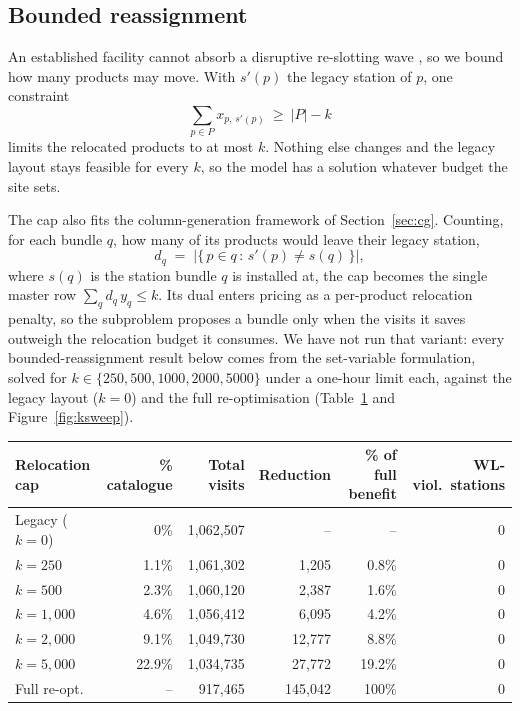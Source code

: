 \documentclass[]{interact}
\begin{document}
\subsection{Bounded reassignment}\label{sec:reassign}
An established facility cannot absorb a disruptive re-slotting wave \citep{chabot2024reassignment}, so we bound how many products may move. With $s'(p)$ the legacy station of $p$, one constraint
\begin{equation}
\sum_{p \in P} x_{p,\,s'(p)} \ \ge\ |P| - k
\label{eq:reassign}
\end{equation}
limits the relocated products to at most $k$. Nothing else changes and the legacy layout stays feasible for every $k$, so the model has a solution whatever budget the site sets.

The cap also fits the column-generation framework of Section~\ref{sec:cg}. Counting, for each bundle $q$, how many of its products would leave their legacy station,
\[
d_q \;=\; \bigl|\{\, p \in q \,:\, s'(p) \neq s(q) \,\}\bigr|,
\]
where $s(q)$ is the station bundle $q$ is installed at, the cap becomes the single master row $\sum_{q} d_q\, y_q \le k$. Its dual enters pricing as a per-product relocation penalty, so the subproblem proposes a bundle only when the visits it saves outweigh the relocation budget it consumes. We have not run that variant: every bounded-reassignment result below comes from the set-variable formulation, solved for $k \in \{250, 500, 1000, 2000, 5000\}$ under a one-hour limit each, against the legacy layout ($k=0$) and the full re-optimisation (Table~\ref{tab:reassign} and Figure~\ref{fig:ksweep}).

\begin{table}[H]
\centering
{}
{\small\begin{tabular*}{\textwidth}{@{\extracolsep{\fill}}lrrrrr@{}}
\toprule
Relocation cap & \% catalogue & Total visits & Reduction & \% of full benefit & WL-viol.\ stations \\
\midrule
Legacy ($k=0$) & 0\% & 1{,}062{,}507 & -- & -- & 0 \\
$k=250$        & 1.1\% & 1{,}061{,}302 & 1{,}205 & 0.8\% & 0 \\
$k=500$        & 2.3\% & 1{,}060{,}120 & 2{,}387 & 1.6\% & 0 \\
$k=1{,}000$    & 4.6\% & 1{,}056{,}412 & 6{,}095 & 4.2\% & 0 \\
$k=2{,}000$    & 9.1\% & 1{,}049{,}730 & 12{,}777 & 8.8\% & 0 \\
$k=5{,}000$    & 22.9\% & 1{,}034{,}735 & 27{,}772 & 19.2\% & 0 \\
Full re-opt.   & --     & 917{,}465 & 145{,}042 & 100\% & 0 \\
\bottomrule
\end{tabular*}}
\label{tab:reassign}
\end{table}
\end{document}
